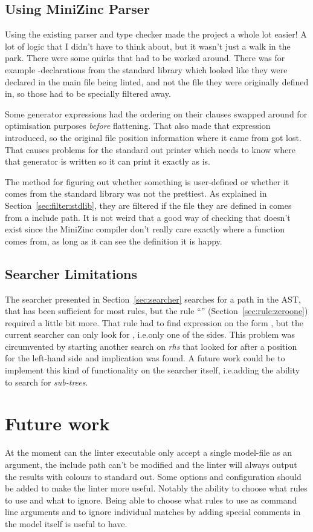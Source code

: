 \documentclass[a4paper,12pt]{article}
\newcommand{\mi}[1]{\mbox{\mzninline{#1}}}
\newcommand{\ruleref}[1]{``\nameref{sec:rule:#1}'' (Section~\ref{sec:rule:#1})}
\begin{document}
\subsection{Using MiniZinc Parser}
Using the existing parser and type checker made the project a whole lot easier! A lot of
logic that I didn't have to think about, but it wasn't just a walk in the park. There were
some quirks that had to be worked around. There was for example \mi{enum}-declarations
from the standard library which looked like they were declared in the main file being
linted, and not the file they were originally defined in, so those had to be specially
filtered away.

Some generator expressions had the ordering on their \mi{where} clauses swapped around for
optimisation purposes \emph{before} flattening. That also made that expression introduced,
so the original file position information where it came from got lost. That causes
problems for the standard out printer which needs to know where that generator is written
so it can print it exactly as is.

The method for figuring out whether something is user-defined or whether it comes from the
standard library was not the prettiest. As explained in Section~\ref{sec:filter:stdlib},
they are filtered if the file they are defined in comes from a include path. It is not
weird that a good way of checking that doesn't exist since the MiniZinc compiler don't
really care exactly where a function comes from, as long as it can see the definition it
is happy.

\subsection{Searcher Limitations}
The searcher presented in Section~\ref{sec:searcher} searches for a path in the AST, that
has been sufficient for most rules, but the rule \ruleref{zeroone} required a little bit
more. That rule had to find expression on the form \mi{a=1 -> b=1}, but the current
searcher can only look for \mi{a=1 -> rhs}, i.e.\@ only one of the sides. This problem was
circumvented by starting another search on \textit{rhs} that looked for \mi{b=1} after a
position for the left-hand side and implication was found. A future work could be to
implement this kind of functionality on the searcher itself, i.e.\@ adding the
ability to search for \emph{sub-trees}.

\section{Future work}
At the moment can the linter executable only accept a single model-file as an argument,
the include path can't be modified and the linter will always output the results with
colours to standard out.
Some options and configuration should be added to make the linter more useful. Notably
the ability to choose what rules to use and what to ignore. Being able to choose what
rules to use as command line arguments and to ignore individual matches by adding special
comments in the model itself is useful to have.
\end{document}
